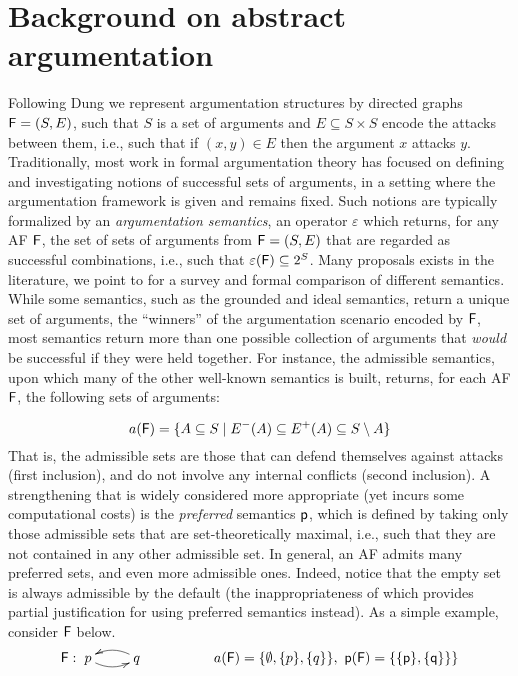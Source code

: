 \documentclass{llncs}
\newcommand{\af}{{\sf F}}
\newcommand{\sem}{\varepsilon}
\begin{document}
\section{Background on abstract argumentation}\label{sec:abt}

Following Dung \cite{Dung} we represent argumentation structures by directed graphs $\af = (S,E)$, such that $S$ is a set of arguments and $E \subseteq S \times S$ encode the attacks between them, i.e., such that if $(x,y) \in E$ then the argument $x$ attacks $y$. Traditionally, most work in formal argumentation theory has focused on defining and investigating notions of successful sets of arguments, in a setting where the argumentation framework is given and remains fixed. Such notions are typically formalized by an \emph{argumentation semantics}, an operator $\sem$ which returns, for any AF $\af$, the set of sets of arguments from $\af = (S,E)$ that are regarded as successful combinations, i.e., such that $\sem(\af) \subseteq 2^S$. Many proposals exists in the literature, we point to \cite{BaroniEval} for a survey and formal comparison of different semantics. While some semantics, such as the grounded and ideal semantics, return a unique set of arguments, the ``winners'' of the argumentation scenario encoded by $\af$, most semantics return more than one possible collection of arguments that \emph{would} be successful if they were held together. For instance, the admissible semantics, upon which many of the other well-known semantics is built, returns, for each AF $\af$, the following sets of arguments:

$$
a(\af) = \{A \subseteq S \mid E^-(A) \subseteq E^+(A) \subseteq S \setminus A\}
$$
That is, the admissible sets are those that can defend themselves against attacks (first inclusion), and do not involve any internal conflicts (second inclusion). A strengthening that is widely considered more appropriate (yet incurs some computational costs) is the \emph{preferred} semantics $\sf p$, which is defined by taking only those admissible sets that are set-theoretically maximal, i.e., such that they are not contained in any other admissible set. In general, an AF admits many preferred sets, and even more admissible ones. Indeed, notice that the empty set is always admissible by the default (the inappropriateness of which provides partial justification for using preferred semantics instead). As a simple example, consider $\af$ below.
$$\begin{array}{ll}
\af: \xymatrix{p \ar@/_/[r] & q \ar@/_/[l] } &\hspace{4em} a(\af) = \{\emptyset,\{p\},\{q\}\}, \ \sf p(\af) = \{\{p\},\{q\}\}\}
\end{array}
$$
\end{document}

